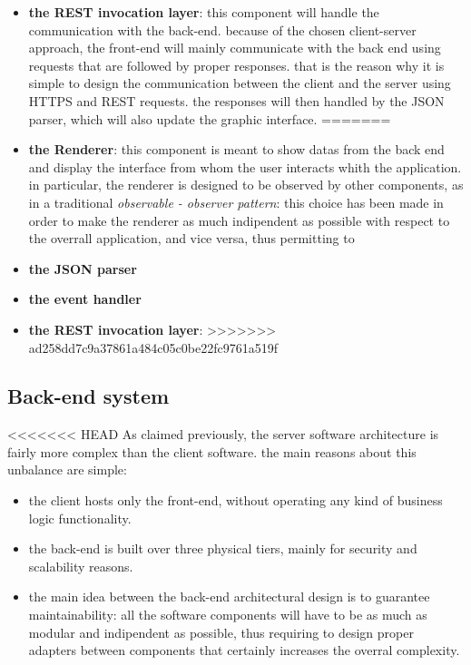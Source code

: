 \begin{itemize}
    \item \textbf{the REST invocation layer}: this component will handle the communication with the back-end. because of the chosen client-server approach, the front-end
                                              will mainly communicate with the back end using requests that are followed by proper responses. that is the reason why it is 
                                              simple to design the communication between the client and the server using HTTPS and REST requests. the responses will then 
                                              handled by the JSON parser, which will also update the graphic interface.
=======
    \item \textbf{the Renderer}: this component is meant to show datas from the back end and display the interface from whom the user interacts whith the application.
                                 in particular, the renderer is designed to be observed by other components, as in a traditional \emph{observable - observer pattern}:
                                 this choice has been made in order to make the renderer as much indipendent as possible with respect to the overrall application, and
                                 vice versa, thus permitting to  
    \item \textbf{the JSON parser}
    \item \textbf{the event handler}
    \item \textbf{the REST invocation layer}:
>>>>>>> ad258dd7c9a37861a484c05c0be22fc9761a519f
\end{itemize}


\subsection{Back-end system}
<<<<<<< HEAD
As claimed previously, the server software architecture is fairly more complex than the client software. the main reasons about this unbalance are simple:
\begin{itemize}
    \item the client hosts only the front-end, without operating any kind of business logic functionality.
    \item the back-end is built over three physical tiers, mainly for security and scalability reasons.
    \item the main idea between the back-end architectural design is to guarantee maintainability: all the software components will have to be as much as 
          modular and indipendent as possible, thus requiring to design proper adapters between components that certainly increases the overral complexity.
\end{itemize}

